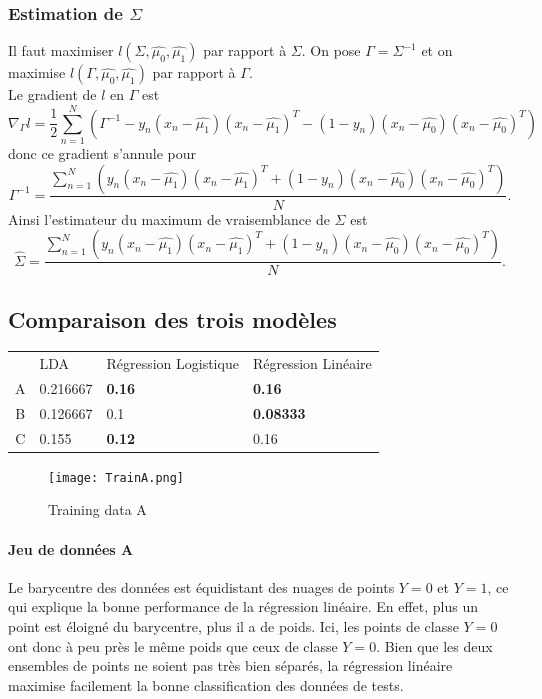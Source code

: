 \documentclass{article}
\begin{document}
\subsubsection{Estimation de $\Sigma$}
Il faut maximiser $l( \Sigma, \hat{\mu_0}, \hat{\mu_1})$ par rapport à
$\Sigma$. On pose $\Gamma=\Sigma^{-1}$ et on maximise $l( \Gamma, \hat{\mu_0}, \hat{\mu_1}) $ par rapport à $\Gamma$.\\
Le gradient de $l$ en $\Gamma$ est $$\nabla_{\Gamma}l=\frac{1}{2} \sum_{n=1}^{N}(\Gamma^{-1}-y_{n}(x_{n}-\hat{\mu_{1}})(x_{n}-\hat{\mu_{1}})^{T}-(1-y_{n})(x_{n}-\hat{\mu_{0}})(x_{n}-\hat{\mu_{0}})^{T})$$
donc ce gradient s'annule pour $$\Gamma^{-1} = \frac{\sum_{n=1}^{N} ( y_{n}(x_{n}-\hat{\mu_{1}})(x_{n}-\hat{\mu_{1}})^{T}+(1-y_{n})(x_{n}-\hat{\mu_{0}})(x_{n}-\hat{\mu_{0}})^{T})}{N}.$$
Ainsi l'estimateur du maximum de vraisemblance de $\Sigma$ est $$\hat{\Sigma} = \frac{\sum_{n=1}^{N} ( y_{n}(x_{n}-\hat{\mu_{1}})(x_{n}-\hat{\mu_{1}})^{T}+(1-y_{n})(x_{n}-\hat{\mu_{0}})(x_{n}-\hat{\mu_{0}})^{T})}{N}.$$

\subsection{Comparaison des trois modèles}


\begin{tabular}{| c | l | l | l |}
          & LDA & Régression Logistique & Régression Linéaire \\
A         & 0.216667 & \textbf{0.16}    & \textbf{0.16}      \\
B         & 0.126667 & 0.1     & \textbf{0.08333}   \\
C         & 0.155    & \textbf{0.12}    & 0.16       \\
\end{tabular}

\begin{figure}[h]
\caption{Training data A}
\texttt{[image: TrainA.png]}
\end{figure}

\paragraph{Jeu de données A}

Le barycentre des données est équidistant des nuages de points $Y = 0$ et $Y =
1$, ce qui explique la bonne performance de la régression linéaire. En effet,
plus un point est éloigné du barycentre, plus il a de poids. Ici, les points
de classe $Y = 0$ ont donc à peu près le même poids que ceux de classe $Y =
0$. Bien que les deux ensembles de points ne soient pas très bien séparés, la
régression linéaire maximise facilement la bonne classification des données de
tests.
\end{document}
